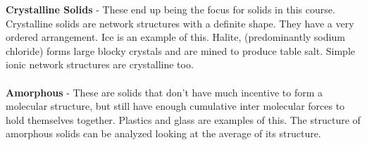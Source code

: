 \documentclass{article}
\begin{document}
\vspace{10pt}
\noindent\textbf{Crystalline Solids} - These end up being the focus for solids in this course. Crystalline solids are network structures with a definite shape. They have a very ordered arrangement. Ice is an example of this. Halite, (predominantly sodium chloride) forms large blocky crystals and are mined to produce table salt. Simple ionic network structures are crystalline too.\\
\\
\textbf{Amorphous} - These are solids that don't have much incentive to form a molecular structure, but still have enough cumulative inter molecular forces to hold themselves together. Plastics and glass are examples of this. The structure of amorphous solids can be analyzed looking at the average of its structure.\\
\\
\end{document}
